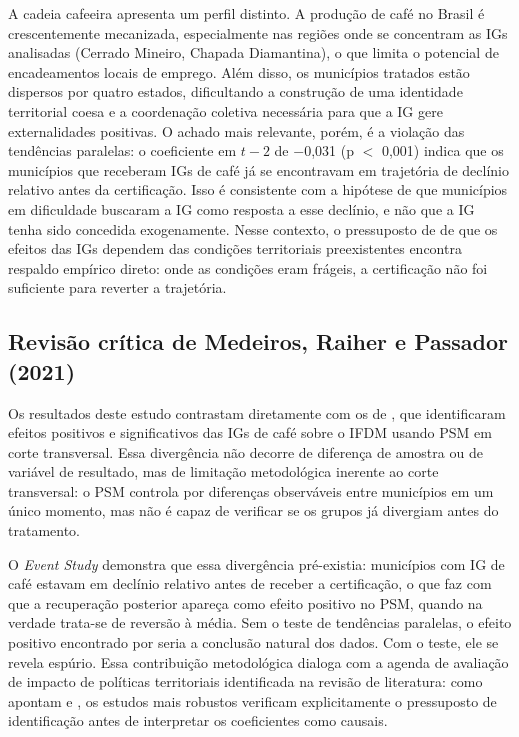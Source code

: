 \documentclass[12pt, a4paper]{article}
\begin{document}
A cadeia cafeeira apresenta um perfil distinto. A produção de café no Brasil é crescentemente mecanizada, especialmente nas regiões onde se concentram as IGs analisadas (Cerrado Mineiro, Chapada Diamantina), o que limita o potencial de encadeamentos locais de emprego. Além disso, os municípios tratados estão dispersos por quatro estados, dificultando a construção de uma identidade territorial coesa e a coordenação coletiva necessária para que a IG gere externalidades positivas. O achado mais relevante, porém, é a violação das tendências paralelas: o coeficiente em $t{-}2$ de $-$0,031 (p $<$ 0,001) indica que os municípios que receberam IGs de café já se encontravam em trajetória de declínio relativo antes da certificação. Isso é consistente com a hipótese de que municípios em dificuldade buscaram a IG como resposta a esse declínio, e não que a IG tenha sido concedida exogenamente. Nesse contexto, o pressuposto de \citet{vaquero2021} de que os efeitos das IGs dependem das condições territoriais preexistentes encontra respaldo empírico direto: onde as condições eram frágeis, a certificação não foi suficiente para reverter a trajetória.

\subsection{Revisão crítica de Medeiros, Raiher e Passador (2021)}

Os resultados deste estudo contrastam diretamente com os de \citet{medeiros2021raiher}, que identificaram efeitos positivos e significativos das IGs de café sobre o IFDM usando PSM em corte transversal. Essa divergência não decorre de diferença de amostra ou de variável de resultado, mas de limitação metodológica inerente ao corte transversal: o PSM controla por diferenças observáveis entre municípios em um único momento, mas não é capaz de verificar se os grupos já divergiam antes do tratamento.

O \textit{Event Study} demonstra que essa divergência pré-existia: municípios com IG de café estavam em declínio relativo antes de receber a certificação, o que faz com que a recuperação posterior apareça como efeito positivo no PSM, quando na verdade trata-se de reversão à média. Sem o teste de tendências paralelas, o efeito positivo encontrado por \citet{medeiros2021raiher} seria a conclusão natural dos dados. Com o teste, ele se revela espúrio. Essa contribuição metodológica dialoga com a agenda de avaliação de impacto de políticas territoriais identificada na revisão de literatura: como apontam \citet{desimone2024} e \citet{crescenzi2022}, os estudos mais robustos verificam explicitamente o pressuposto de identificação antes de interpretar os coeficientes como causais.
\end{document}
